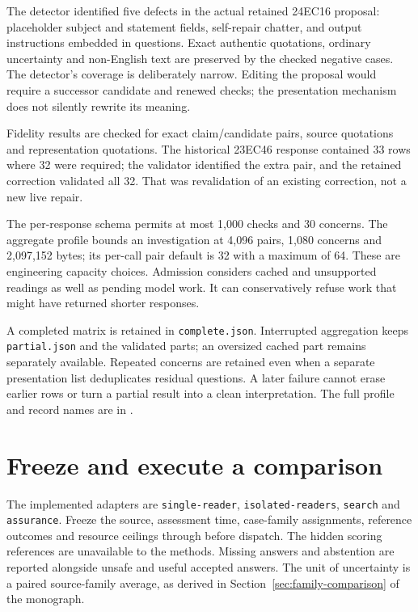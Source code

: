 The detector identified five defects in the actual retained 24EC16 proposal:
placeholder subject and statement fields, self-repair chatter, and output
instructions embedded in questions. Exact authentic quotations, ordinary
uncertainty and non-English text are preserved by the checked negative cases.
The detector's coverage is deliberately narrow. Editing the proposal would
require a successor candidate and renewed checks; the presentation mechanism
does not silently rewrite its meaning.

Fidelity results are checked for exact claim/candidate pairs, source quotations
and representation quotations. The historical 23EC46 response contained 33 rows
where 32 were required; the validator identified the extra pair, and the
retained correction validated all 32. That was revalidation of an existing
correction, not a new live repair.

The per-response schema permits at most 1,000 checks and 30 concerns. The
aggregate profile bounds an investigation at 4,096 pairs, 1,080 concerns and
2,097,152 bytes; its per-call pair default is 32 with a maximum of 64. These
are engineering capacity choices. Admission considers cached and unsupported
readings as well as pending model work. It can conservatively refuse work that
might have returned shorter responses.

A completed matrix is retained in \texttt{complete.json}. Interrupted aggregation
keeps \texttt{partial.json} and the validated parts; an oversized cached part
remains separately available. Repeated concerns are retained even when a
separate presentation list deduplicates residual questions. A later failure
cannot erase earlier rows or turn a partial result into a clean interpretation.
The full profile and record names are in
.

\section{Freeze and execute a comparison}

The implemented adapters are \texttt{single-reader}, \texttt{isolated-readers},
\texttt{search} and \texttt{assurance}. Freeze the source, assessment time,
case-family assignments, reference outcomes and resource ceilings through
 before dispatch.
The hidden scoring references are unavailable to the methods. Missing answers
and abstention are reported alongside unsafe and useful accepted answers.
The unit of uncertainty is a paired source-family average, as derived in
Section~\ref{sec:family-comparison} of the monograph.


